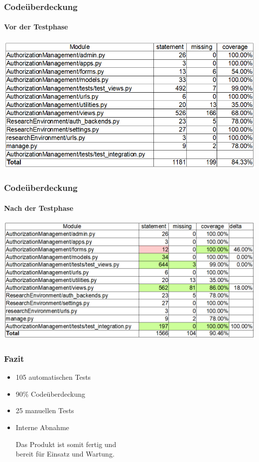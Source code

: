 \documentclass{beamer}
\begin{document}

\begin{frame}
\frametitle{Codeüberdeckung}
\framesubtitle{Vor der Testphase}
\begin{center}
\includegraphics[width=\linewidth,height=\textheight,keepaspectratio]{res/coverage_before.png}
\end{center}
\end{frame}


\begin{frame}
\frametitle{Codeüberdeckung}
\framesubtitle{Nach der Testphase}
\begin{center}
\includegraphics[width=\linewidth,height=\textheight,keepaspectratio]{res/coverage_after.png}
\end{center}
\end{frame}

\begin{frame}
\frametitle{Fazit}
	\begin{itemize}
		\item<1-4> 105 automatischen Tests
		\item<2-4> 90\% Codeüberdeckung
		\item<3-4> 25 manuellen Tests
		\item<4> Interne Abnahme\\
	
	\begin{center}
	Das Produkt ist somit fertig und \\bereit für Einsatz und Wartung.
	\end{center}
	
	\end{itemize}
\end{frame}
\end{document}
